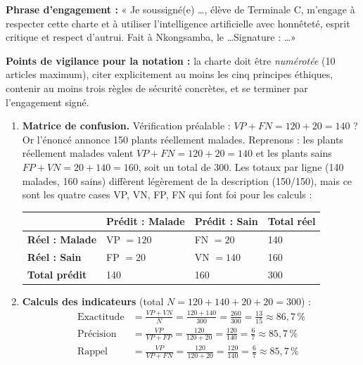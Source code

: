 \documentclass[11pt]{article}
\begin{document}
\begin{corrige}
\textbf{Phrase d'engagement :} « Je soussigné(e) \ldots, élève de Terminale C, m'engage à respecter cette charte et à utiliser l'intelligence artificielle avec honnêteté, esprit critique et respect d'autrui. Fait à Nkongsamba, le \ldots \quad Signature : \ldots »

\textbf{Points de vigilance pour la notation :} la charte doit être \emph{numérotée} (10 articles maximum), citer explicitement au moins les cinq principes éthiques, contenir au moins trois règles de sécurité concrètes, et se terminer par l'engagement signé.
\end{corrige}

\begin{corrige}
\begin{enumerate}
\item \textbf{Matrice de confusion.} Vérification préalable : $VP + FN = 120 + 20 = 140$ ? Or l'énoncé annonce 150 plants réellement malades. Reprenons : les plants réellement malades valent $VP + FN = 120 + 20 = 140$ et les plants sains $FP + VN = 20 + 140 = 160$, soit un total de $300$. Les totaux par ligne (140 malades, 160 sains) diffèrent légèrement de la description (150/150), mais ce sont les quatre cases VP, VN, FP, FN qui font foi pour les calculs :
\begin{center}
\begin{tabularx}{\linewidth}{|l|X|X|X|}
\hline
\rowcolor{popblueL} & \textbf{Prédit : Malade} & \textbf{Prédit : Sain} & \textbf{Total réel} \\
\hline
\textbf{Réel : Malade} & VP $= 120$ & FN $= 20$ & 140 \\
\hline
\textbf{Réel : Sain} & FP $= 20$ & VN $= 140$ & 160 \\
\hline
\textbf{Total prédit} & 140 & 160 & 300 \\
\hline
\end{tabularx}
\end{center}
\item \textbf{Calculs des indicateurs} (total $N = 120 + 140 + 20 + 20 = 300$) :
\begin{align*}
\text{Exactitude} &= \frac{VP + VN}{N} = \frac{120 + 140}{300} = \frac{260}{300} = \frac{13}{15} \approx 86,7\,\%\\[4pt]
\text{Précision} &= \frac{VP}{VP + FP} = \frac{120}{120 + 20} = \frac{120}{140} = \frac{6}{7} \approx 85,7\,\%\\[4pt]
\text{Rappel} &= \frac{VP}{VP + FN} = \frac{120}{120 + 20} = \frac{120}{140} = \frac{6}{7} \approx 85,7\,\%

\end{align*}
\end{enumerate}
\end{corrige}
\end{document}
